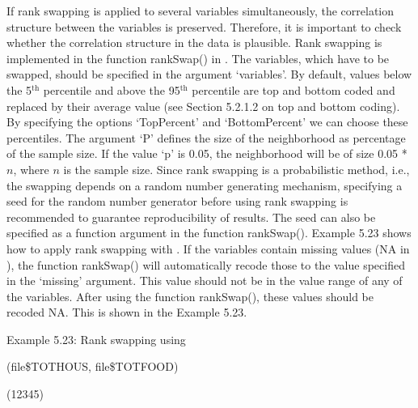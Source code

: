 \documentclass[letterpaper,10pt,english]{sphinxmanual}
\begin{document}
If rank swapping is applied to several variables simultaneously, the
correlation structure between the variables is preserved. Therefore, it
is important to check whether the correlation structure in the data is
plausible. Rank swapping is implemented in the function rankSwap() in
. The variables, which have to be swapped, should be specified
in the argument ‘variables’. By default, values below the 5$^{\text{th}}$
percentile and above the 95$^{\text{th}}$ percentile are top and bottom
coded and replaced by their average value (see Section 5.2.1.2 on top
and bottom coding). By specifying the options ‘TopPercent’ and
‘BottomPercent’ we can choose these percentiles. The argument ‘P’
defines the size of the neighborhood as percentage of the sample size.
If the value ‘p’ is 0.05, the neighborhood will be of size 0.05 *
\(n\), where \(n\) is the sample size. Since rank swapping is a
probabilistic method, i.e., the swapping depends on a random number
generating mechanism, specifying a seed for the random number generator
before using rank swapping is recommended to guarantee reproducibility
of results. The seed can also be specified as a function argument in the
function rankSwap(). Example 5.23 shows how to apply rank swapping with
. If the variables contain missing values (NA in ), the
function rankSwap() will automatically recode those to the value
specified in the ‘missing’ argument. This value should not be in the
value range of any of the variables. After using the function
rankSwap(), these values should be recoded NA. This is shown in the
Example 5.23.

Example 5.23: Rank swapping using 

\begin{DUlineblock}{0em}
\item[] 
\item[] (file\$TOTHOUS, file\$TOTFOOD)
\end{DUlineblock}


\begin{DUlineblock}{0em}
\item[] 
\item[] (12345)
\end{DUlineblock}
\end{document}
